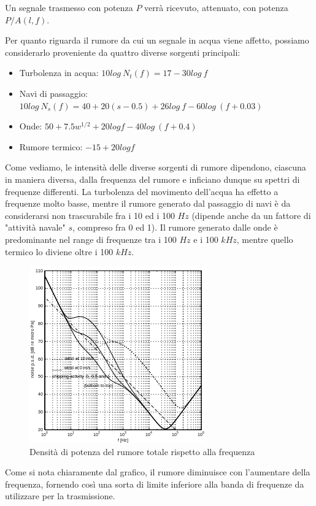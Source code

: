 \documentclass[Lau,binding=0.6cm]{sapthesis}
\begin{document}
Un segnale trasmesso con potenza $P$ verrà ricevuto, attenuato, con potenza $P/A(l, f)$.
\par
Per quanto riguarda il rumore da cui un segnale in acqua viene affetto, possiamo considerarlo proveniente da quattro diverse sorgenti principali:
\begin{itemize}
    \item Turbolenza in acqua: $10log\ N_t(f) = 17 - 30log\ f$
    \item Navi di passaggio: $10log\ N_s(f) = 40 + 20(s - 0.5) + 26log\ f - 60log\ (f+0.03)$
    \item Onde: $50 + 7.5w^{1/2}+ 20logf - 40log\ (f+0.4)$
    \item Rumore termico: $-15 + 20logf$
\end{itemize}
Come vediamo, le intensità delle diverse sorgenti di rumore dipendono, ciascuna in maniera diversa, dalla frequenza del rumore e inficiano dunque su spettri di frequenze differenti. La turbolenza del movimento dell'acqua ha effetto a frequenze molto basse, mentre il rumore generato dal passaggio di navi è da considerarsi non trascurabile fra i 10 ed i 100 $Hz$ (dipende anche da un fattore di "attività navale" $s$, compreso fra 0 ed 1). Il rumore generato dalle onde è predominante nel range di frequenze tra i 100 $Hz$ e i 100 $kHz$, mentre quello termico lo diviene oltre i 100 $kHz$.
\begin{figure}[H]
    \centering
    \includegraphics[]{noise.png}
    \caption{Densità di potenza del rumore totale rispetto alla frequenza}
\end{figure}
Come si nota chiaramente dal grafico, il rumore diminuisce con l'aumentare della frequenza, fornendo così una sorta di limite inferiore alla banda di frequenze da utilizzare per la trasmissione.
\par
\end{document}
